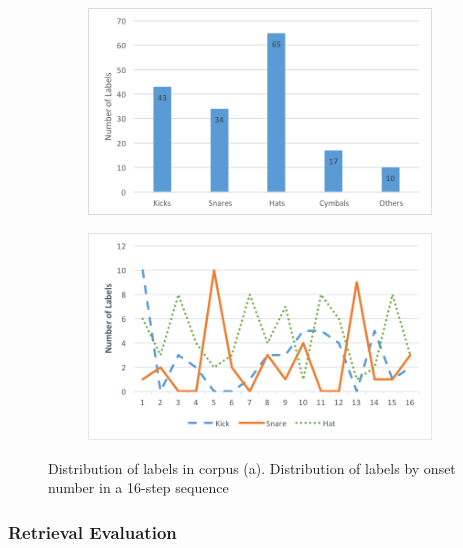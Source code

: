 \begin{figure}
\centering
\begin{subfigure}[b]{0.75\textwidth}
   \includegraphics[width=1\linewidth]{ch07_evaluation/figures/corpus_distribution.png}
   \caption{}
   \label{fig:distrib1} 
\end{subfigure}

\begin{subfigure}[b]{0.75\textwidth}
   \includegraphics[width=1\linewidth]{ch07_evaluation/figures/target_distribution.png}
   \caption{}
   \label{fig:distrib2}
\end{subfigure}

\caption[Distribution of labels in Breakbeat collection]{Distribution of labels in corpus (a). Distribution of labels by onset number in a 16-step sequence}
\end{figure}

\subsubsection{Retrieval Evaluation}

